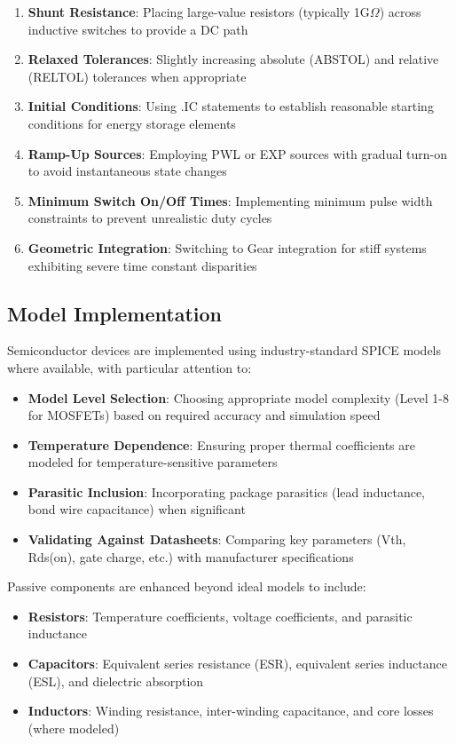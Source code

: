 \begin{enumerate}
    \item \textbf{Shunt Resistance}: Placing large-value resistors (typically 1G$\Omega$) across inductive switches to provide a DC path
    \item \textbf{Relaxed Tolerances}: Slightly increasing absolute (ABSTOL) and relative (RELTOL) tolerances when appropriate
    \item \textbf{Initial Conditions}: Using .IC statements to establish reasonable starting conditions for energy storage elements
    \item \textbf{Ramp-Up Sources}: Employing PWL or EXP sources with gradual turn-on to avoid instantaneous state changes
    \item \textbf{Minimum Switch On/Off Times}: Implementing minimum pulse width constraints to prevent unrealistic duty cycles
    \item \textbf{Geometric Integration}: Switching to Gear integration for stiff systems exhibiting severe time constant disparities
\end{enumerate}

\subsection{Model Implementation}
Semiconductor devices are implemented using industry-standard SPICE models where available, with particular attention to:
\begin{itemize}
    \item \textbf{Model Level Selection}: Choosing appropriate model complexity (Level 1-8 for MOSFETs) based on required accuracy and simulation speed
    \item \textbf{Temperature Dependence}: Ensuring proper thermal coefficients are modeled for temperature-sensitive parameters
    \item \textbf{Parasitic Inclusion}: Incorporating package parasitics (lead inductance, bond wire capacitance) when significant
    \item \textbf{Validating Against Datasheets}: Comparing key parameters (Vth, Rds(on), gate charge, etc.) with manufacturer specifications
\end{itemize}

Passive components are enhanced beyond ideal models to include:
\begin{itemize}
    \item \textbf{Resistors}: Temperature coefficients, voltage coefficients, and parasitic inductance
    \item \textbf{Capacitors}: Equivalent series resistance (ESR), equivalent series inductance (ESL), and dielectric absorption
    \item \textbf{Inductors}: Winding resistance, inter-winding capacitance, and core losses (where modeled)
\end{itemize}

